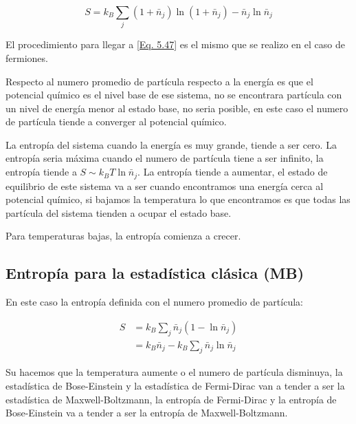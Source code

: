 \documentclass[11pt,fleqn]{book}
\begin{document}
\begin{equation}
    S=k_{B}\sum_{j}(1+\bar{n}_{j})\ln{(1+\bar{n}_{j})}-\bar{n}_{j}\ln{\bar{n}_{j}}
    \label{Eq. 5.47}
\end{equation}


\begin{exercise}

El procedimiento para llegar a \ref{Eq. 5.47} es el mismo que se realizo en el caso de fermiones.
\end{exercise}

Respecto al numero promedio de partícula respecto a la energía es que el potencial químico es el nivel base de ese sistema, no se encontrara partícula con un nivel de energía menor al estado base, no seria posible, en este caso el numero de partícula tiende a converger al potencial químico.


La entropía del sistema cuando la energía es muy grande, tiende a ser cero. La entropía seria máxima cuando el numero de partícula tiene a ser infinito, la entropía tiende a $S\sim k_{B}T\ln{\bar{n}_{j}}$. La entropía tiende a aumentar, el estado de equilibrio de este sistema va a ser cuando encontramos una energía cerca al potencial químico, si bajamos la temperatura lo que encontramos es que todas las partícula del sistema tienden a ocupar el estado base. 


Para temperaturas bajas, la entropía comienza a crecer. 

\subsection{Entropía para la estadística clásica (MB)}

En este caso la entropía definida con el numero promedio de partícula:

\begin{equation}
    \begin{split}
        S&=k_{B}\sum_{j}\bar{n}_{j}(1-\ln{\bar{n}_{j}})\\        
        &=k_{B}\bar{n}_{j}-k_{B}\sum_{j}\bar{n}_{j}\ln{\bar{n}_{j}}
    \end{split}
    \label{Eq. 5.48}
\end{equation}

Su hacemos que la temperatura aumente o el numero de partícula disminuya, la estadística de Bose-Einstein y la estadística de Fermi-Dirac van a tender a ser la estadística de Maxwell-Boltzmann, la entropía de Fermi-Dirac y la entropía de Bose-Einstein va a tender a ser la entropía de Maxwell-Boltzmann.
\end{document}
